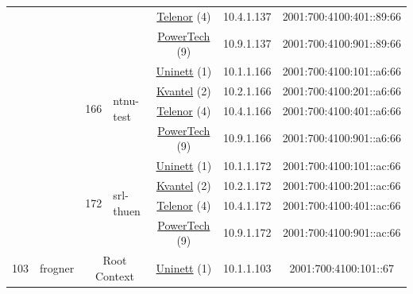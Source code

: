 \begin{small}
\begin{center}
\begin{longtable}{|c|c|c|c|c|c|c|c|}
  &  &  &  & \multicolumn{2}{|c|}{\tiny{\href{https://www.telenor.no}{Telenor} (4)}} & \tiny{10.4.1.137} & \tiny{2001:700:4100:401::89:66} \\* \cline{5-5}\cline{6-6}\cline{7-7}\cline{8-8}
  &  &  &  & \multicolumn{2}{|c|}{\tiny{\href{http://www.powertech.no}{PowerTech} (9)}} & \tiny{10.9.1.137} & \tiny{2001:700:4100:901::89:66} \\* \cline{3-3}\cline{4-4}\cline{5-5}\cline{6-6}\cline{7-7}\cline{8-8}
  &  & \multirow{4}{*}{\tiny{166}} & \multicolumn{1}{|l|}{\multirow{4}{*}{\tiny{ntnu-test}}} & \multicolumn{2}{|c|}{\tiny{\href{https://www.uninett.no}{Uninett} (1)}} & \tiny{10.1.1.166} & \tiny{2001:700:4100:101::a6:66} \\* \cline{5-5}\cline{6-6}\cline{7-7}\cline{8-8}
  &  &  &  & \multicolumn{2}{|c|}{\tiny{\href{http://kvantel.no}{Kvantel} (2)}} & \tiny{10.2.1.166} & \tiny{2001:700:4100:201::a6:66} \\* \cline{5-5}\cline{6-6}\cline{7-7}\cline{8-8}
  &  &  &  & \multicolumn{2}{|c|}{\tiny{\href{https://www.telenor.no}{Telenor} (4)}} & \tiny{10.4.1.166} & \tiny{2001:700:4100:401::a6:66} \\* \cline{5-5}\cline{6-6}\cline{7-7}\cline{8-8}
  &  &  &  & \multicolumn{2}{|c|}{\tiny{\href{http://www.powertech.no}{PowerTech} (9)}} & \tiny{10.9.1.166} & \tiny{2001:700:4100:901::a6:66} \\* \cline{3-3}\cline{4-4}\cline{5-5}\cline{6-6}\cline{7-7}\cline{8-8}
  &  & \multirow{4}{*}{\tiny{172}} & \multicolumn{1}{|l|}{\multirow{4}{*}{\tiny{srl-thuen}}} & \multicolumn{2}{|c|}{\tiny{\href{https://www.uninett.no}{Uninett} (1)}} & \tiny{10.1.1.172} & \tiny{2001:700:4100:101::ac:66} \\* \cline{5-5}\cline{6-6}\cline{7-7}\cline{8-8}
  &  &  &  & \multicolumn{2}{|c|}{\tiny{\href{http://kvantel.no}{Kvantel} (2)}} & \tiny{10.2.1.172} & \tiny{2001:700:4100:201::ac:66} \\* \cline{5-5}\cline{6-6}\cline{7-7}\cline{8-8}
  &  &  &  & \multicolumn{2}{|c|}{\tiny{\href{https://www.telenor.no}{Telenor} (4)}} & \tiny{10.4.1.172} & \tiny{2001:700:4100:401::ac:66} \\* \cline{5-5}\cline{6-6}\cline{7-7}\cline{8-8}
  &  &  &  & \multicolumn{2}{|c|}{\tiny{\href{http://www.powertech.no}{PowerTech} (9)}} & \tiny{10.9.1.172} & \tiny{2001:700:4100:901::ac:66} \\ \hline
 \multirow{32}{*}{\tiny{103}} & \multicolumn{1}{|l|}{\multirow{32}{*}{\tiny{frogner}}} & \multicolumn{2}{|c|}{\multirow{4}{*}{\tiny{Root Context}}} & \multicolumn{2}{|c|}{\tiny{\href{https://www.uninett.no}{Uninett} (1)}} & \tiny{10.1.1.103} & \tiny{2001:700:4100:101::67} \\* \cline{5-5}\cline{6-6}\cline{7-7}\cline{8-8}

\end{longtable}
\end{center}
\end{small}
